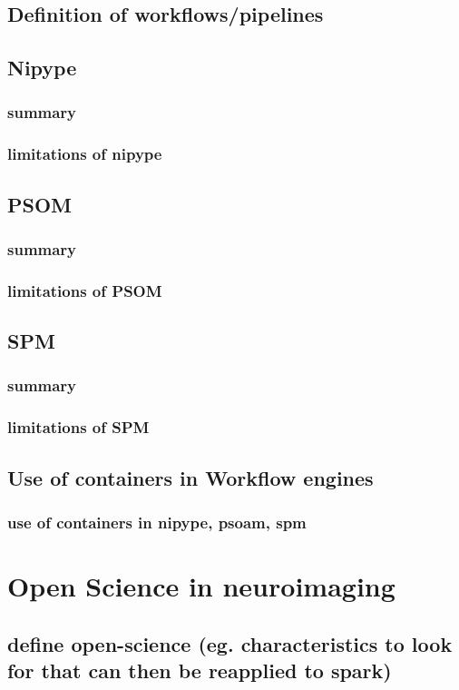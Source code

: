 \documentclass{report}
\begin{document}
	\section{Definition of workflows/pipelines}
	\section{Nipype}
		\subsection{summary}
		\subsection{limitations of nipype}
	\section{PSOM}
		\subsection{summary}
		\subsection{limitations of PSOM}
	\section{SPM}
		\subsection{summary}
		\subsection{limitations of SPM}
	\section{Use of containers in Workflow engines}
		\subsection{use of containers in nipype, psoam, spm}
\chapter{Open Science in neuroimaging}
	\section{define open-science (eg. characteristics to look for that can then be reapplied to spark)}
\end{document}
